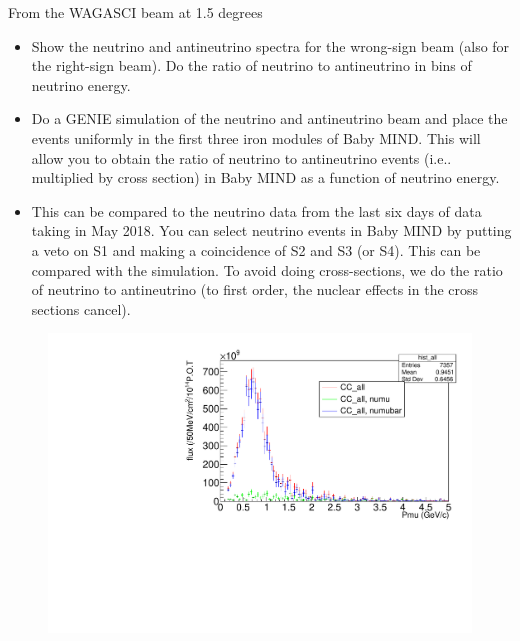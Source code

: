 \documentclass[11pt]{beamer}
\begin{document}
\begin{frame}{From the WAGASCI beam at 1.5 degrees}
\begin{block}{}
	\begin{tiny}
		\begin{itemize}
\item Show the neutrino and antineutrino spectra for the wrong-sign beam (also for the right-sign beam). Do the ratio of neutrino to antineutrino in bins of neutrino energy.
\item Do a GENIE simulation of the neutrino and antineutrino beam and place the events uniformly in the first three iron modules of Baby MIND. This will allow you to obtain the ratio of neutrino to antineutrino events (i.e.. multiplied by cross section) in Baby MIND as a function of neutrino energy.
\item This can be compared to the neutrino data from the last six days of data taking in May 2018. You can select neutrino events in Baby MIND by putting a veto on S1 and making a coincidence of S2 and S3 (or S4). This can be compared with the simulation. To avoid doing cross-sections, we do the ratio of neutrino to antineutrino (to first order, the nuclear effects in the cross sections cancel).

		\end{itemize}
	\end{tiny}
\end{block}

		\begin{figure}[h!]
	\centering
	\includegraphics[width=.6\textwidth]{ND280Flux.pdf}
\end{figure}

\end{frame}
\end{document}
